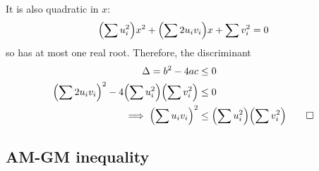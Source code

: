 \documentclass[fleqn,a4paper,11pt]{article}
\begin{document}
    It is also quadratic in \(x\):
    \begin{equation*}
    \pqty{\sum u_i^2} x^2 + \pqty{\sum 2 u_i v_i} x + \sum v_i^2 = 0
    \end{equation*}
    so has at most one real root. Therefore, the discriminant
    \begin{align*}
    \Delta = b^2 - 4ac &\le 0 \\
    \pqty{\sum 2 u_i v_i}^2 - 4\pqty{\sum u_i^2}\pqty{\sum v_i^2} &\le 0
    \\\implies
    \pqty{\sum u_i v_i}^2 &\le \pqty{\sum u_i^2} \pqty{\sum v_i^2} \qed
    \end{align*}

    \subsection{AM-GM inequality}
\end{document}
